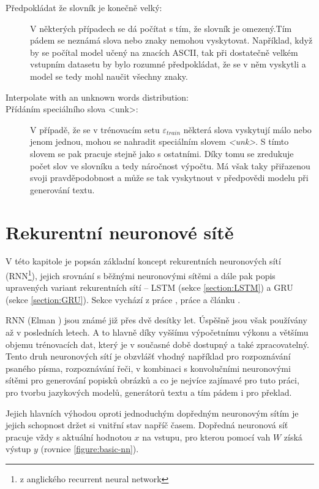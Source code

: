 \begin{description}
  \item[Předpokládat že slovník je konečně velký:] V některých případech se dá počítat s tím, že slovník je omezený.Tím pádem se neznámá slova nebo znaky nemohou vyskytovat. Například, když by se počítal model učený na znacích ASCII, tak při dostatečně velkém vstupním datasetu by bylo rozumné předpokládat, že se v něm vyskytli a model se tedy mohl naučit všechny znaky.
  \item[Interpolate with an unknown words distribution:] 
  \item[Přídáním speciálního slova <unk>:]\label{description:unk}V případě, že se v trénovacím setu $\varepsilon_{train}$ některá slova vyskytují málo nebo jenom jednou, mohou se nahradit speciálním slovem \emph{<unk>}. S tímto slovem se pak pracuje stejně jako s ostatními. Díky tomu se zredukuje počet slov ve slovníku a tedy náročnost výpočtu. Má však taky přiřazenou svoji pravděpodobnost a může se tak vyskytnout v předpovědi modelu při generování textu. 
\end{description}

\section{Rekurentní neuronové sítě}\label{section:rnn}
V této kapitole je popsán základní koncept rekurentních neuronových sítí (RNN\footnote{z anglického recurrent neural network}), jejich srovnání s běžnými neuronovými sítěmi a dále pak popis upravených variant rekurentních sítí -- LSTM (sekce \ref{section:LSTM}) a GRU (sekce \ref{section:GRU}). Sekce vychází z práce \cite{nmtThesis}, práce \cite{nmtTutorial} a článku \cite{understandingLSTM}.


RNN (Elman \cite{rnn}) jsou známé již přes dvě desítky let. Úspěšně jsou však používány až v posledních letech. A to hlavně díky vyššímu výpočetnímu výkonu a většímu objemu trénovacích dat, který je v současné době dostupný a také zpracovatelný. Tento druh neuronových sítí je obzvlášť vhodný například pro rozpoznávání psaného písma, rozpoznávání řeči, v kombinaci s konvolučními neuronovými sítěmi pro generování popisků obrázků a co je nejvíce zajímavé pro tuto práci, pro tvorbu jazykových modelů, generátorů textu a tím pádem i pro překlad.

Jejich hlavních výhodou oproti jednoduchým dopředným neuronovým sítím je jejich schopnost držet si vnitřní stav napříč časem. Dopředná neuronová síť pracuje vždy s aktuální hodnotou $x$ na vstupu, pro kterou pomocí vah $W$ získá výstup $y$ (rovnice \ref{figure:basic-nn}).

